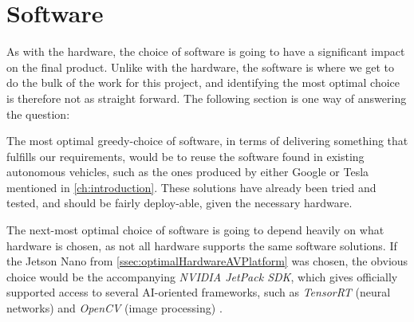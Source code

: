 \section{Software}\label{sec:optimalSoftware}
As with the hardware, the choice of software is going to have a significant impact on the final product.
Unlike with the hardware, the software is where we get to do the bulk of the work for this project, and identifying the most optimal choice is therefore not as straight forward.
The following section is one way of answering the question:

The most optimal greedy-choice of software, in terms of delivering something that fulfills our requirements, would be to reuse the software found in existing autonomous vehicles, such as the ones produced by either Google or Tesla mentioned in \autoref{ch:introduction}.
These solutions have already been tried and tested, and should be fairly deploy-able, given the necessary hardware.

The next-most optimal choice of software is going to depend heavily on what hardware is chosen, as not all hardware supports the same software solutions.
If the Jetson Nano from \autoref{ssec:optimalHardwareAVPlatform} was chosen, the obvious choice would be the accompanying \textit{NVIDIA JetPack SDK}, which gives officially supported access to several AI-oriented frameworks, such as \textit{TensorRT} (neural networks) and \textit{OpenCV} (image processing) \cite{JetPack}.
